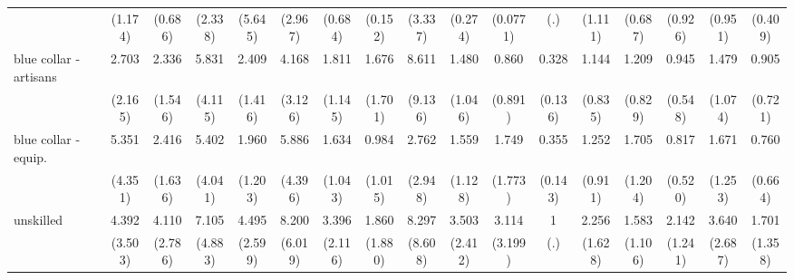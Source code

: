{\begin{tabular}{l*{16}{c}}
                    &     (1.174)         &     (0.686)         &     (2.338)         &     (5.645)         &     (2.967)         &     (0.684)         &     (0.152)         &     (3.337)         &     (0.274)         &    (0.0771)         &         (.)         &     (1.111)         &     (0.687)         &     (0.926)         &     (0.951)         &     (0.409)         \\
[1em]
blue collar - artisans&       2.703         &       2.336         &       5.831\sym{*}  &       2.409         &       4.168         &       1.811         &       1.676         &       8.611\sym{*}  &       1.480         &       0.860         &       0.328\sym{**} &       1.144         &       1.209         &       0.945         &       1.479         &       0.905         \\
                    &     (2.165)         &     (1.546)         &     (4.115)         &     (1.416)         &     (3.126)         &     (1.145)         &     (1.701)         &     (9.136)         &     (1.046)         &     (0.891)         &     (0.136)         &     (0.835)         &     (0.829)         &     (0.548)         &     (1.074)         &     (0.721)         \\
[1em]
blue collar - equip.&       5.351\sym{*}  &       2.416         &       5.402\sym{*}  &       1.960         &       5.886\sym{*}  &       1.634         &       0.984         &       2.762         &       1.559         &       1.749         &       0.355\sym{*}  &       1.252         &       1.705         &       0.817         &       1.671         &       0.760         \\
                    &     (4.351)         &     (1.636)         &     (4.041)         &     (1.203)         &     (4.396)         &     (1.043)         &     (1.015)         &     (2.948)         &     (1.128)         &     (1.773)         &     (0.143)         &     (0.911)         &     (1.204)         &     (0.520)         &     (1.253)         &     (0.664)         \\
[1em]
unskilled           &       4.392         &       4.110\sym{*}  &       7.105\sym{**} &       4.495\sym{**} &       8.200\sym{**} &       3.396\sym{*}  &       1.860         &       8.297\sym{*}  &       3.503         &       3.114         &           1         &       2.256         &       1.583         &       2.142         &       3.640         &       1.701         \\
                    &     (3.503)         &     (2.786)         &     (4.883)         &     (2.599)         &     (6.019)         &     (2.116)         &     (1.880)         &     (8.608)         &     (2.412)         &     (3.199)         &         (.)         &     (1.628)         &     (1.106)         &     (1.241)         &     (2.687)         &     (1.358)         \\

\end{tabular}}
